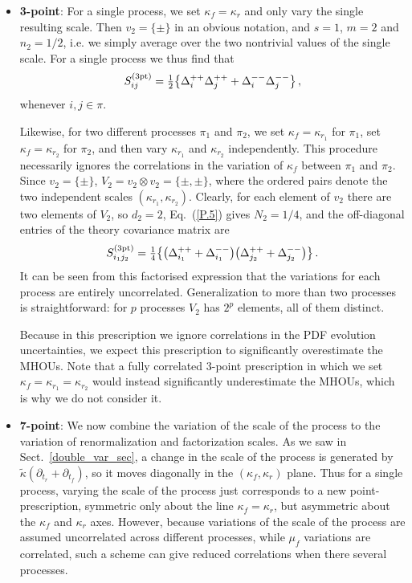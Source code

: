 \begin{itemize}

\item \textbf{3-point}: For a single process,
  we set $\kappa_f = \kappa_r$  and only vary the single resulting scale. Then $v_2 = \{\pm\}$
  in an obvious notation, and $s =1$, $m=2$ and $n_2 = 1/2$, i.e. we
  simply average over the two nontrivial values of the single
  scale.
  For a single process we thus find that
\begin{equation}\label{3S}
    S^{(\rm 3pt)}_{ij} = \hbox{${{1}\over {2}}$}\big\{ \Delta_i^{++}\Delta_j^{++}  + \Delta_i^{--}\Delta_j^{--}\big\} \, ,
\end{equation}
%
whenever $i,j\in \pi$.

Likewise, for two different processes $\pi_1$ and $\pi_2$, we set $\kappa_f = \kappa_{r_1}$ 
for $\pi_1$, set $\kappa_f = \kappa_{r_2}$ for $\pi_2$, and then vary
$\kappa_{r_1}$ and $\kappa_{r_2}$ independently.
%
This procedure necessarily
ignores the correlations in  
the variation of $\kappa_f$ between $\pi_1$ and $\pi_2$. Since $v_2 =
\{\pm\}$, $V_2 = v_2 \otimes v_2 = \{\pm, \pm \}$, where the ordered
pairs denote the two independent scales $(\kappa_{r_1},\kappa_{r_2})$.
%
Clearly,
for each element of $v_2$ there are two elements of $V_2$, so $d_2 =2$, 
Eq.~(\ref{P.5}) gives $N_2 = 1/4$, and the off-diagonal
entries of the theory covariance matrix are
\begin{equation}
    S^{(\rm 3pt)}_{i_1j_2} = \hbox{${{1}\over {4}}$}\big\{\big(\Delta_{i_1}^{++} + \Delta_{i_1}^{--} \big) \big(\Delta_{j_2}^{++} + \Delta_{j_2}^{--} \big) \big\}\, .
\end{equation}
It can be seen from this factorised expression that the
variations for each process are entirely uncorrelated. Generalization
to more than two processes is straightforward: for $p$ processes $V_2$
has $2^p$ elements, all of them distinct. 

Because in this prescription we ignore correlations in the PDF evolution uncertainties, we expect this prescription to significantly overestimate the MHOUs.
%
Note that a fully correlated 3-point prescription in which we set
$\kappa_f = \kappa_{r_1} = \kappa_{r_2}$ would instead significantly underestimate
the MHOUs, which is why we do not consider it.

\item \textbf{7-point}:  We now  combine the variation of the scale
  of the process to the variation of renormalization and factorization scales.
As we saw in Sect.~\ref{double_var_sec}, a change in the scale
of the process is generated by $\tilde\kappa (\partial_{t_r} +
\partial_{t_f})$, so it moves diagonally in the
$(\kappa_f,\kappa_{r})$ plane.
%
Thus for a single process, varying the
scale of the process just corresponds to a new point-prescription,
symmetric only about the line $\kappa_f=\kappa_r$, but
asymmetric about the $\kappa_f$ and $\kappa_r$ axes.
%
However, because
variations of the scale of the process are assumed uncorrelated across
different processes, while $\mu_f$ variations are correlated, such a
scheme can give reduced correlations when there several processes. 


\end{itemize}
